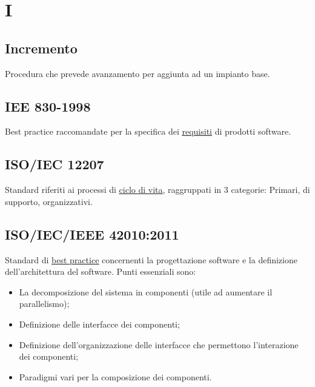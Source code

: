	\section{I}

	\subsection{Incremento}
	\label{sec:incremento}
	Procedura che prevede avanzamento per aggiunta ad un impianto base.

	\subsection{IEE 830-1998}
	\label{sec:iee830}
	Best practice raccomandate per la specifica dei \underline{\hyperref[sec:requisito]{requisiti}} di prodotti software. 
	\linebreak

	\subsection{ISO/IEC 12207}
	\label{sec:iso12207}
	Standard riferiti ai processi di \underline{\hyperref[sec:ciclodivita]{ciclo di vita}}, raggruppati in 3 categorie: Primari, di supporto, organizzativi.
	\linebreak

	\subsection{ISO/IEC/IEEE 42010:2011}
	\label{sec:iso12207}
	Standard di \underline{\hyperref[sec:bestpractice]{best practice}} concernenti la progettazione software e la definizione dell'architettura del software. Punti essenziali sono:
	\begin{itemize}  
	\item La decomposizione del sistema in componenti (utile ad aumentare il parallelismo);
	\item Definizione delle interfacce dei componenti;
	\item Definizione dell'organizzazione delle interfacce che permettono l'interazione dei componenti;
	\item Paradigmi vari per la composizione dei componenti.
	\end{itemize}		

